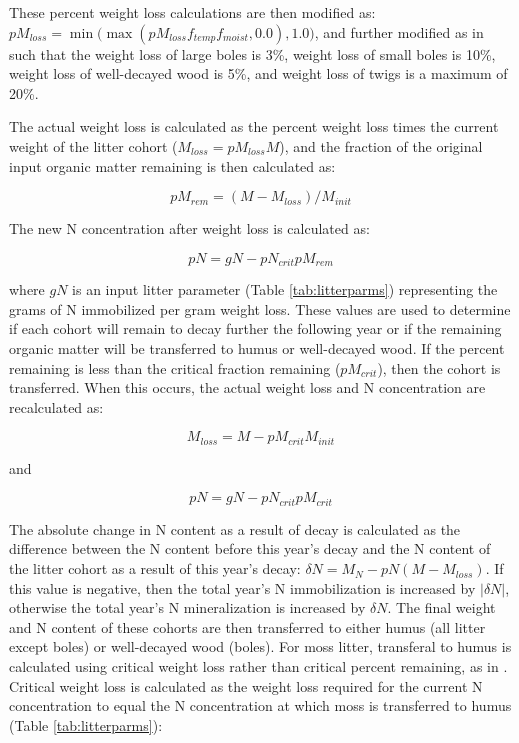 \documentclass[a4paper, 12pt] {report}
\begin{document}
These percent weight loss calculations are then modified as: $pM_{loss} = \min\Big(\max(pM_{loss}f_{temp}f_{moist}, 0.0), 1.0\Big)$, and further modified as in   such that the weight loss of large boles is 3\%, weight loss of small boles is 10\%, weight loss of well-decayed wood is 5\%, and weight loss of twigs is a maximum of 20\%.

The actual weight loss is calculated as the percent weight loss times the current weight of the litter cohort ($M_{loss} = pM_{loss}M$), and the fraction of the original input organic matter remaining is then calculated as:

\begin{equation} 
pM_{rem} = (M - M_{loss})/M_{init}
\end{equation}

The new N concentration after weight loss is calculated as:

\begin{equation} 
pN = gN - pN_{crit}pM_{rem}
\end{equation}

where $gN$ is an input litter parameter (Table \ref{tab:litterparms}) representing the grams of N immobilized per gram weight loss. These values are used to determine if each cohort will remain to decay further the following year or if the remaining organic matter will be transferred to humus or well-decayed wood. If the percent remaining is less than the critical fraction remaining ($pM_{crit}$), then the cohort is transferred. When this occurs, the actual weight loss and N concentration are recalculated as:

\begin{equation} 
M_{loss} = M - pM_{crit}M_{init}
\end{equation}

and

\begin{equation} 
pN = gN - pN_{crit}pM_{crit}
\end{equation}

The absolute change in N content as a result of decay is calculated as the difference between the N content before this year's decay and the N content of the litter cohort as a result of this year's decay: $\delta N = M_N - pN(M - M_{loss})$. If this value is negative, then the total year's N immobilization is increased by $|\delta N|$, otherwise the total year's N mineralization is increased by $\delta N$. The final weight and N content of these cohorts are then transferred to either humus (all litter except boles) or well-decayed wood (boles). For moss litter, transferal to humus is calculated using critical weight loss rather than critical percent remaining, as in . Critical weight loss is calculated as the weight loss required for the current N concentration to equal the N concentration at which moss is transferred to humus (Table \ref{tab:litterparms}):
\end{document}
